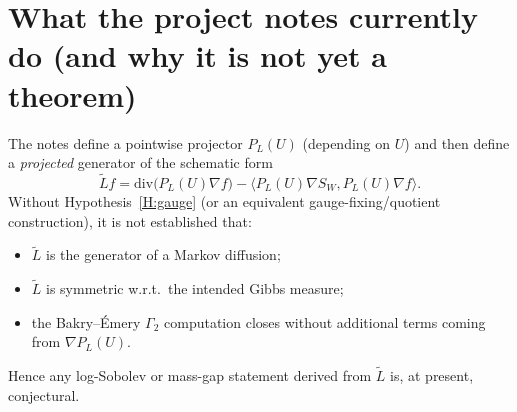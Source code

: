 \documentclass[11pt]{article}
\begin{document}
\section{What the project notes currently do (and why it is not yet a theorem)}

The notes define a pointwise projector $P_L(U)$ (depending on $U$) and then define a \emph{projected} generator of the schematic form
\[
\tilde L f = \mathrm{div}\!\big(P_L(U)\nabla f\big)-\langle P_L(U)\nabla S_W, P_L(U)\nabla f\rangle.
\]
Without Hypothesis~\ref{H:gauge} (or an equivalent gauge-fixing/quotient construction), it is not established that:
\begin{itemize}[leftmargin=*]
\item $\tilde L$ is the generator of a Markov diffusion;
\item $\tilde L$ is symmetric w.r.t.\ the intended Gibbs measure;
\item the Bakry--\'Emery $\Gamma_2$ computation closes without additional terms coming from $\nabla P_L(U)$.
\end{itemize}
Hence any log-Sobolev or mass-gap statement derived from $\tilde L$ is, at present, conjectural.
\end{document}
